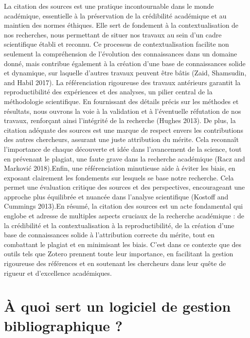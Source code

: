 \documentclass[
  letterpaper,
]{scrbook}
\begin{document}
La citation des sources est une pratique incontournable dans le monde
académique, essentielle à la préservation de la crédibilité académique
et au maintien des normes éthiques. Elle sert de fondement à la
contextualisation de nos recherches, nous permettant de situer nos
travaux au sein d'un cadre scientifique établi et reconnu. Ce processus
de contextualisation facilite non seulement la compréhension de
l'évolution des connaissances dans un domaine donné, mais contribue
également à la création d'une base de connaissances solide et dynamique,
sur laquelle d'autres travaux peuvent être bâtis (Zaid, Shamsudin, and
Habil 2017). La référenciation rigoureuse des travaux antérieurs
garantit la reproductibilité des expériences et des analyses, un pilier
central de la méthodologie scientifique. En fournissant des détails
précis sur les méthodes et résultats, nous ouvrons la voie à la
validation et à l'éventuelle réfutation de nos travaux, renforçant ainsi
l'intégrité de la recherche (Hughes 2013). De plus, la citation adéquate
des sources est une marque de respect envers les contributions des
autres chercheurs, assurant une juste attribution du mérite. Cela
reconnaît l'importance de chaque découverte et idée dans l'avancement de
la science, tout en prévenant le plagiat, une faute grave dans la
recherche académique (Racz and Marković 2018).Enfin, une référenciation
minutieuse aide à éviter les biais, en exposant clairement les
fondements sur lesquels se base notre recherche. Cela permet une
évaluation critique des sources et des perspectives, encourageant une
approche plus équilibrée et nuancée dans l'analyse scientifique (Kostoff
and Cummings 2013).En résumé, la citation des sources est un acte
fondamental qui englobe et adresse de multiples aspects cruciaux de la
recherche académique : de la crédibilité et la contextualisation à la
reproductibilité, de la création d'une base de connaissances solide à
l'attribution correcte du mérite, tout en combattant le plagiat et en
minimisant les biais. C'est dans ce contexte que des outils tels que
Zotero prennent toute leur importance, en facilitant la gestion
rigoureuse des références et en soutenant les chercheurs dans leur quête
de rigueur et d'excellence académiques.

\hypertarget{uxe0-quoi-sert-un-logiciel-de-gestion-bibliographique}{%
\section{À quoi sert un logiciel de gestion bibliographique
?}\label{uxe0-quoi-sert-un-logiciel-de-gestion-bibliographique}}
\end{document}

